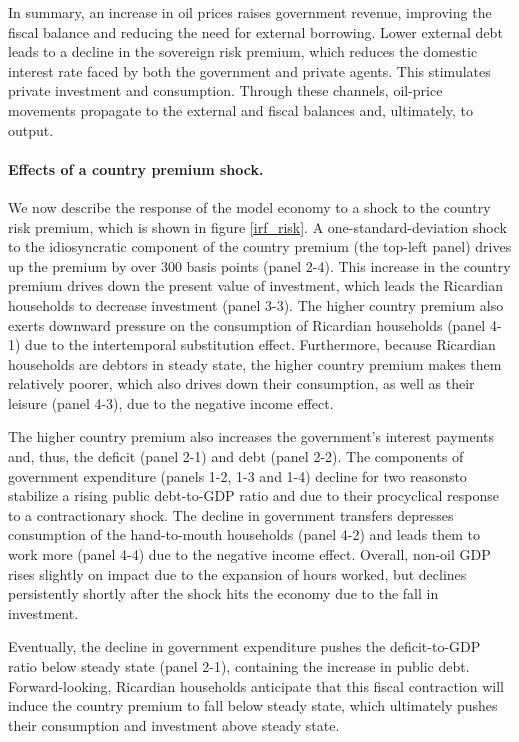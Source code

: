 \documentclass[12pt]{article}
\begin{document}
In summary, an increase in oil prices raises government revenue, improving the fiscal balance and reducing the need for external borrowing. Lower external debt leads to a decline in the sovereign risk premium, which reduces the domestic interest rate faced by both the government and private agents. This stimulates private investment and consumption. Through these channels, oil-price movements propagate to the external and fiscal balances and, ultimately, to output.

\paragraph{Effects of a country premium shock.}
We now describe the response of the model economy to a shock to the country risk premium, which is shown in figure \ref{irf_risk}. A one-standard-deviation shock to the idiosyncratic component of the country premium (the top-left panel) drives up the premium by over 300 basis points (panel 2-4). This increase in the country premium drives down the present value of investment, which leads the Ricardian households to decrease investment (panel 3-3). The higher country premium also exerts downward pressure on the consumption of Ricardian households (panel 4-1) due to  the intertemporal substitution effect. Furthermore, because Ricardian households are debtors in steady state, the higher country premium makes them relatively poorer, which also drives down their consumption, as well as their leisure (panel 4-3), due to the negative income effect. 

The higher country premium also increases the government's interest payments and, thus, the deficit (panel 2-1) and debt (panel 2-2). The components of government expenditure (panels 1-2, 1-3 and 1-4) decline for two reasons\textemdash to stabilize a rising public debt-to-GDP ratio and due to their procyclical response to a contractionary shock. The decline in government transfers depresses consumption of the hand-to-mouth households (panel 4-2) and leads them to work more (panel 4-4) due to the negative income effect. Overall, non-oil GDP rises slightly on impact due to the expansion of hours worked, but declines persistently shortly after the shock hits the economy due to the fall in investment.

Eventually, the decline in government expenditure pushes the deficit-to-GDP ratio below steady state (panel 2-1), containing the increase in public debt. Forward-looking, Ricardian households anticipate that this fiscal contraction will induce the country premium to fall below steady state, which ultimately pushes their consumption and investment above steady state. 
\end{document}
